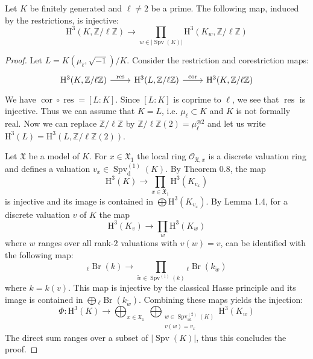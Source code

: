 \begin{lemma}\label{2.4-finitelygenerated}
Let $K$ be finitely generated and $\ell\neq 2$ be a prime. The following map, induced by the restrictions, is injective:
\[ \mathrm{H}^3(K,\mathbb{Z}/\ell\mathbb{Z})\longrightarrow\prod_{w\in |\operatorname{Spv}(K)| }\mathrm{H}^3(K_w,\mathbb{Z}/\ell\mathbb{Z}) \]
\end{lemma}

\begin{proof}
Let $L=K(\mu_{\ell},\sqrt{-1})/K$. Consider the restriction and corestriction maps:
\[ \begin{tikzcd}
\mathrm{H}^3(K,\mathbb{Z}/\ell\mathbb{Z}) \ar[r, "\operatorname{res}"] & \mathrm{H}^3(L,\mathbb{Z}/\ell\mathbb{Z})\ar[r, "\operatorname{cor}"]& \mathrm{H}^3(K,\mathbb{Z}/\ell\mathbb{Z}) 
\end{tikzcd} \]
We have $\operatorname{cor}\circ\operatorname{res} = [L:K]$. Since $[L:K]$ is coprime to $\ell$, we see that $\operatorname{res}$ is injective. Thus we can assume that $K=L$, i.e. $\mu_{\ell}\subset K$ and $K$ is not formally real. Now we can replace $\mathbb{Z}/\ell\mathbb{Z}$ by $\mathbb{Z}/\ell\mathbb{Z}(2) = \mu_\ell^{\otimes 2}$ and let us write $\mathrm{H}^3(L) = \mathrm{H}^3(L, \mathbb{Z}/\ell\mathbb{Z}(2))$. 

Let $\mathfrak{X}$ be a model of $K$. For $x\in\mathfrak{X}_1$ the local ring $\mathcal{O}_{\mathfrak{X}, x}$ is a discrete valuation ring and defines a valuation $v_x\in\operatorname{Spv}_\text{d}^{(1)}(K)$. By \cite{Ka86} Theorem 0.8, the map
\[ \mathrm{H}^3(K)\longrightarrow \prod_{x\in\mathfrak{X}_1}\mathrm{H}^3(K_{v_x}) \]
is injective and its image is contained in $\bigoplus \mathrm{H}^3(K_{v_x})$. By \cite{Ka86} Lemma 1.4, for a discrete valuation $v$ of $K$ the map
\[ \mathrm{H}^3(K_v) \longrightarrow \prod_w\mathrm{H}^3(K_w) \]
where $w$ ranges over all rank-$2$ valuations with $v(w) = v$, can be identified with the following map:
\[ {}_\ell\operatorname{Br}(k) \longrightarrow \prod_{\widetilde{w}\in\operatorname{Spv}^{(1)}(k)} {}_\ell\operatorname{Br}(k_{\widetilde{w}}) \]
where $k = k(v)$. This map is injective by the classical Hasse principle and its image is contained in $\bigoplus {}_\ell\operatorname{Br}(k_{\widetilde{w}})$. Combining these maps yields the injection:
\[\Phi: \mathrm{H}^3(K)\longrightarrow \bigoplus_{x\in\mathfrak{X}_1}\  \bigoplus_{\substack{w\in\operatorname{Spv}_\text{rd}^{(2)}(K) \\ v(w) = v_x}} \mathrm{H}^3(K_w) \]
The direct sum ranges over a subset of $|\operatorname{Spv}(K)|$, thus this concludes the proof. 
\end{proof}

